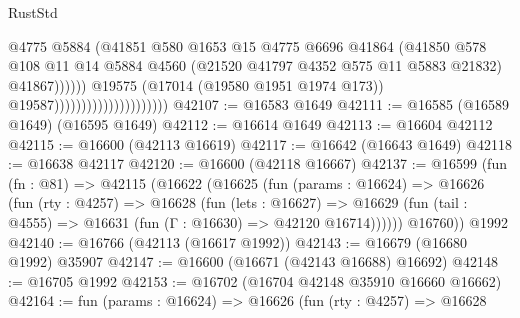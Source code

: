 \begin{lexlean}{RustStd}
\begin{coremodule}
{\begin{coremodule}
{{{{{{{{{{{{{{{{{{{{{{{{{{{{{{{{{{{{{{{{{{{{{{{{{{{{{{{                                                      @4775
                                                      @5884
                                                      (@41851
                                                        @580
                                                        @1653
                                                        @15
                                                        @4775
                                                        @6696
                                                        @41864
                                                        (@41850
                                                          @578
                                                          @108
                                                          @11
                                                          @14
                                                          @5884
                                                          @4560
                                                          (@21520
                                                            @41797
                                                            @4352
                                                            @575
                                                            @11
                                                            @5883
                                                            @21832)
                                                          @41867))))))
                                              @19575
                                              (@17014 (@19580 @1951 @1974 @173))
                                              @19587)))))))))))))))))))))
@42107 := @16583 @1649
@42111 := @16585 (@16589 @1649) (@16595 @1649)
@42112 := @16614 @1649
@42113 := @16604 @42112
@42115 := @16600 (@42113 @16619)
@42117 := @16642 (@16643 @1649)
@42118 := @16638 @42117
@42120 := @16600 (@42118 @16667)
@42137 := @16599
    (fun (fn : @81) =>
    @42115
      (@16622
        (@16625
          (fun (params : @16624) =>
          @16626
            (fun (rty : @4257) =>
            @16628
              (fun (lets : @16627) =>
              @16629 (fun (tail : @4555) => @16631 (fun (Γ : @16630) => @42120 @16714))))))
        @16760))
    @1992
@42140 := @16766 (@42113 (@16617 @1992))
@42143 := @16679 (@16680 @1992) @35907
@42147 := @16600 (@16671 (@42143 @16688) @16692)
@42148 := @16705 @1992
@42153 := @16702 (@16704 @42148 @35910 @16660 @16662)
@42164 := fun (params : @16624) =>
  @16626
    (fun (rty : @4257) =>
    @16628
}}}}}}}}}}}}}}}}}}}}}}}}}}}}}}}}}}}}}}}}}}}}}}}}}}}}}}}
\end{coremodule}}
\end{coremodule}
\end{lexlean}
